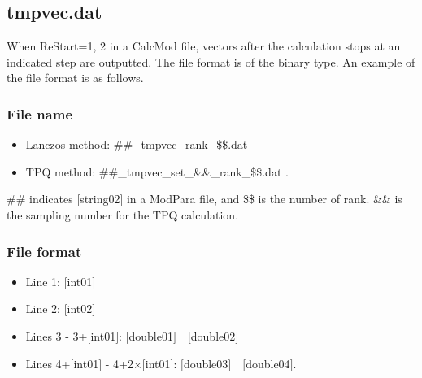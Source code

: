 \newpage
\subsection{{tmpvec.dat}}
\label{Subsec:restart}
When ReStart=1, 2 in a CalcMod file, vectors after the calculation stops at an indicated step are outputted. The file format is of the binary type.  An example of the file format is as follows.

\subsubsection{File name}
\begin{itemize}
   \item{Lanczos method: \#\#\_tmpvec\_rank\_\$\$.dat}
   \item{TPQ method: \#\#\_tmpvec\_set\_\&\&\_rank\_\$\$.dat}  .
\end{itemize}
  \#\# indicates [string02] in a ModPara file, and \$\$ is the number of rank. \&\& is the sampling number for the TPQ calculation. 

\subsubsection{File format}
 \begin{itemize}
   \item  Line 1: $[$int01$]$
   \item  Line 2: $[$int02$]$
   \item  Lines 3 - 3+$[$int01$]$: $[$double01$]$~~$[$double02$]$
   \item  Lines 4+$[$int01$]$ - 4+2$\times[$int01$]$: $[$double03$]$~~$[$double04$]$.
  \end{itemize}

